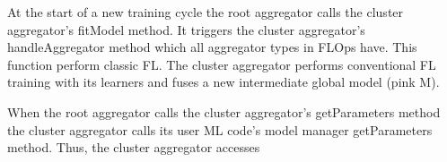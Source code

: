 At the start of a new training cycle the root aggregator calls the cluster aggregator's fitModel method.
It triggers the cluster aggregator's handleAggregator method which all aggregator types in FLOps have.
This function perform classic FL.
The cluster aggregator performs conventional FL training with its learners and fuses a new intermediate global model (pink M).


When the root aggregator calls the cluster aggregator's getParameters method the cluster aggregator calls its user ML code's model manager getParameters method.
Thus, the cluster aggregator accesses 